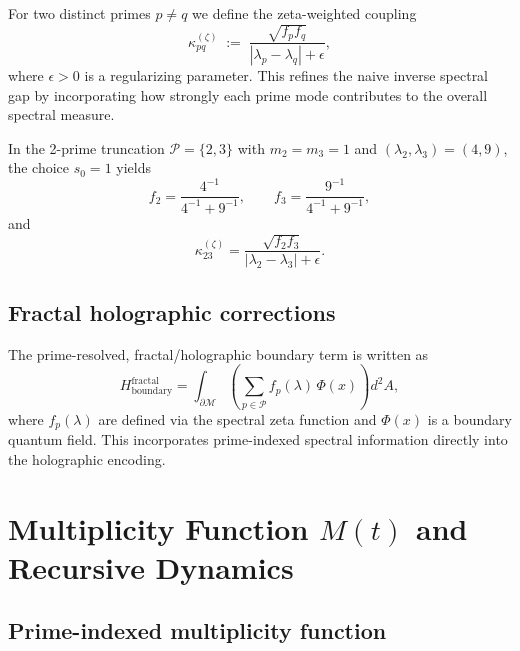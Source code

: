 \documentclass[11pt]{article}
\begin{document}
For two distinct primes \(p \ne q\) we define the zeta-weighted coupling
\begin{equation}
  \kappa_{pq}^{(\zeta)}
  \;:=\;
  \frac{\sqrt{f_p f_q}}{|\lambda_p - \lambda_q| + \epsilon},
\end{equation}
where \(\epsilon>0\) is a regularizing parameter.
This refines the naive inverse spectral gap by incorporating how strongly each prime mode contributes to the overall spectral measure.

In the 2-prime truncation \(\mathcal{P} = \{2,3\}\) with \(m_2 = m_3 = 1\) and \((\lambda_2,\lambda_3) = (4,9)\), the choice \(s_0 = 1\) yields
\begin{equation}
  f_2
  =
  \frac{4^{-1}}{4^{-1}+9^{-1}},
  \qquad
  f_3
  =
  \frac{9^{-1}}{4^{-1}+9^{-1}},
\end{equation}
and
\begin{equation}
  \kappa_{23}^{(\zeta)}
  =
  \frac{\sqrt{f_2 f_3}}{|\lambda_2 - \lambda_3| + \epsilon}.
\end{equation}

\subsection{Fractal holographic corrections}

The prime-resolved, fractal/holographic boundary term is written as
\begin{equation}
  H_{\text{boundary}}^{\text{fractal}}
  =
  \int_{\partial \mathcal{M}}
  \left(
  \sum_{p\in\mathcal{P}} f_p(\lambda)\, \Phi(x)
  \right) d^2 A,
\end{equation}
where \(f_p(\lambda)\) are defined via the spectral zeta function and \(\Phi(x)\) is a boundary quantum field.
This incorporates prime-indexed spectral information directly into the holographic encoding.

\section{Multiplicity Function \texorpdfstring{\(M(t)\)}{M(t)} and Recursive Dynamics}

\subsection{Prime-indexed multiplicity function}
\end{document}
